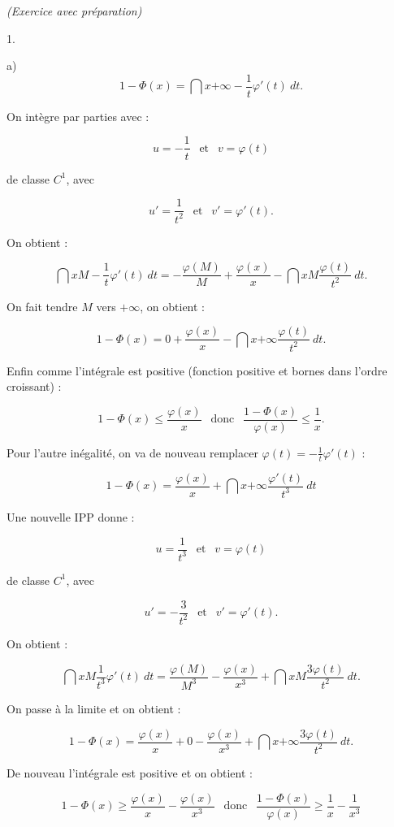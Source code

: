\documentclass[11pt]{article}%
\begin{document}
\begin{exercice}{\it (Exercice avec préparation)}
\begin{noliste}{1.}
\begin{noliste}{a)}
\[
 1 - \Phi (x) = \dint{x}{ + \infty } - \frac{1}{t} \varphi' (t) \ dt. 
\]

 On intègre par parties avec : 
 
\[
 u = - \frac{ 1 }{ t } \ \ \text{ et } \ \ v = \varphi (t) 
\]

 de classe $C^{1}$, avec
 
\[
 u' = \frac{ 1 }{ t^{2} } \ \ \text{ et } \ \ v' = \varphi' (t). 
\]

 On obtient : 
 
\[
 \dint{x}{M} - \frac{1}{t} \varphi' (t) \ dt = - \frac{ \varphi (M ) }{
M } + \frac{ \varphi (x) }{ x } - \dint{x}{M} \frac{ \varphi (t) }{
t^{2} } \ dt. 
\]

 On fait tendre $M$ vers $ + \infty$, on obtient : 
 
\[
 1 - \Phi (x) = 0 + \frac{ \varphi (x) }{ x } - \dint{x}{+ \infty}
\frac{ \varphi (t) }{ t^{2} } \ dt. 
\]

 Enfin comme l'intégrale est positive (fonction positive et bornes dans
l'ordre croissant) : 
 
\[
 1 - \Phi ( x) \leq \frac{ \varphi (x) }{ x } \ \ \text{ donc } \ \
\frac{ 1 - \Phi ( x ) }{ \varphi (x) } \leq \frac{ 1 }{ x }. 
\]

 Pour l'autre inégalité, on va de nouveau remplacer $\varphi (t) = -
\frac{ 1 }{ t } \varphi' (t)$ : 
 
\[
 1 - \Phi (x) = \frac{ \varphi (x) }{ x } + \dint{x}{+ \infty} \frac{
\varphi' (t) }{ t^{3} } \ dt 
\]

 Une nouvelle IPP donne : 
 
\[
 u = \frac{ 1 }{ t^{3} } \ \ \text{ et } \ \ v = \varphi (t) 
\]

 de classe $C^{1}$, avec
 
\[
 u' = - \frac{ 3 }{ t^{2} } \ \ \text{ et } \ \ v' = \varphi' (t). 
\]

 On obtient : 
 
\[
 \dint{x}{M} \frac{1}{t^{3}} \varphi' (t) \ dt = \frac{ \varphi (M ) }{
M^{3} } - \frac{ \varphi (x) }{ x^{3} } + \dint{x}{M} \frac{ 3\varphi
(t) }{ t^{2} } \ dt. 
\]

 On passe à la limite et on obtient : 
 
\[
 1 - \Phi (x) = \frac{ \varphi (x) }{ x } + 0 - \frac{ \varphi (x) }{
x^{3} } + \dint{x}{+ \infty } \frac{ 3\varphi (t) }{ t^{2} } \ dt. 
\]

 De nouveau l'intégrale est positive et on obtient : 
 
\[
 1 - \Phi (x) \geq \frac{ \varphi (x) }{ x } - \frac{ \varphi (x) }{
x^{3} } \ \ \text{ donc } \ \ \frac{ 1 - \Phi (x) }{ \varphi (x) } \geq
\frac{ 1 }{ x } - \frac{ 1 }{ x^{3} } 
\]


\end{noliste}
\end{noliste}
\end{exercice}
\end{document}
